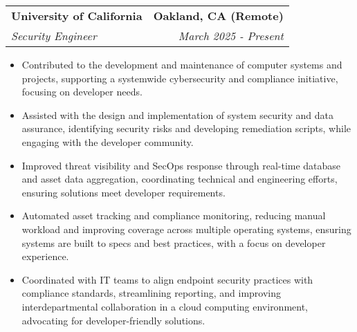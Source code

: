 \documentclass[letterpaper,10pt]{article}
\makeatletter
\newcommand{\resumeItem}[1]{\item\small{#1}}
\newcommand{\resumeItemListStart}{\begin{itemize}}
\newcommand{\resumeItemListEnd}{\end{itemize}\vspace{-2pt}}
\newcommand{\resumeSubheading}[4]{%
  \vspace{-2pt}\item
  \begin{tabular*}{\textwidth}[t]{l@{\extracolsep{\fill}}r}
    \textbf{\large #1} & \textbf{\small #2} \\
    \textit{\large #3} & \textit{\small #4} \\
  \end{tabular*}\vspace{-2pt}
}
\makeatother
\begin{document}
\resumeSubheading
  {University of California}{Oakland, CA (Remote)}
  {Security Engineer}{March 2025 - Present}
  \vspace{2pt}
\resumeItemListStart
  \resumeItem{Contributed to the development and maintenance of computer systems and projects, supporting a systemwide cybersecurity and compliance initiative, focusing on developer needs.} 
  \resumeItem{Assisted with the design and implementation of system security and data assurance, identifying security risks and developing remediation scripts, while engaging with the developer community.} 
  \resumeItem{Improved threat visibility and SecOps response through real-time database and asset data aggregation, coordinating technical and engineering efforts, ensuring solutions meet developer requirements.} 
  \resumeItem{Automated asset tracking and compliance monitoring, reducing manual workload and improving coverage across multiple operating systems, ensuring systems are built to specs and best practices, with a focus on developer experience.} 
  \resumeItem{Coordinated with IT teams to align endpoint security practices with compliance standards, streamlining reporting, and improving interdepartmental collaboration in a cloud computing environment, advocating for developer-friendly solutions.} 
\resumeItemListEnd
\vspace{6pt}
\end{document}
